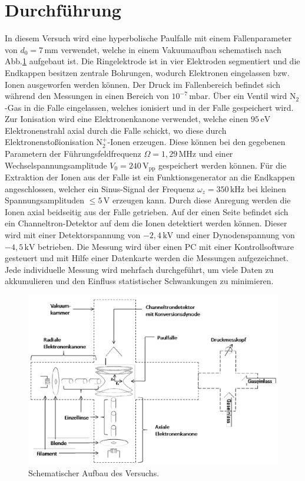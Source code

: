 \documentclass[numbers=noenddot,a4paper,notitlepage,twoside,BCOR15mm]{scrartcl}
\begin{document}
	\section{Durchführung}
	In diesem Versuch wird eine hyperbolische Paulfalle mit einem Fallenparameter von $d_0 = 7\,\mathrm{mm}$ verwendet, welche in einem Vakuumaufbau schematisch nach Abb.\ref{img:aufbau} aufgebaut ist. Die Ringelektrode ist in vier Elektroden segmentiert und die Endkappen besitzen zentrale Bohrungen, wodurch Elektronen eingelassen bzw. Ionen ausgeworfen werden können. Der Druck im Fallenbereich befindet sich während den Messungen in einen Bereich von $10^{-7}\,\mathrm{mbar}$. Über ein Ventil wird N$_2$-Gas in die Falle eingelassen, welches ionisiert und in der Falle gespeichert wird. Zur Ionisation wird eine Elektronenkanone verwendet, welche einen $95\,\mathrm{eV}$ Elektronenstrahl axial durch die Falle schickt, wo diese durch Elektronenstoßionisation N$_2^+$-Ionen erzeugen. Diese können bei den gegebenen Parametern der Führungsfeldfrequenz $\Omega = 1,29\,\mathrm{MHz}$ und einer Wechselspannungsamplitude $V_0  = 240\,\mathrm{V_{pp}}$ gespeichert werden können. Für die Extraktion der Ionen aus der Falle ist ein Funktionsgenerator an die Endkappen angeschlossen, welcher ein Sinus-Signal der Frequenz $\omega_z = 350\,\mathrm{kHz}$ bei kleinen Spannungsamplituden $\leq 5\,\mathrm{V}$ erzeugen kann. Durch diese Anregung werden die Ionen axial beidseitig aus der Falle getrieben. Auf der einen Seite befindet sich ein Channeltron-Detektor auf dem die Ionen detektiert werden können. Dieser wird mit einer Detektorspannung von $-2,4\,\mathrm{kV}$ und einer Dynodenspannung von $-4,5\,\mathrm{kV}$ betrieben. Die Messung wird über einen PC mit einer Kontrollsoftware gesteuert und mit Hilfe einer Datenkarte werden die Messungen aufgezeichnet. Jede individuelle Messung wird mehrfach durchgeführt, um viele Daten zu akkumulieren und den Einfluss statistischer Schwankungen zu minimieren.
		\begin{figure}
			\centering
			\includegraphics[width=1\textwidth]{pics/aufbau.png}
			\caption{Schematischer Aufbau des Versuchs. \cite{EMAUGreifswaldPaul}}\label{img:aufbau}
		\end{figure}
\end{document}
